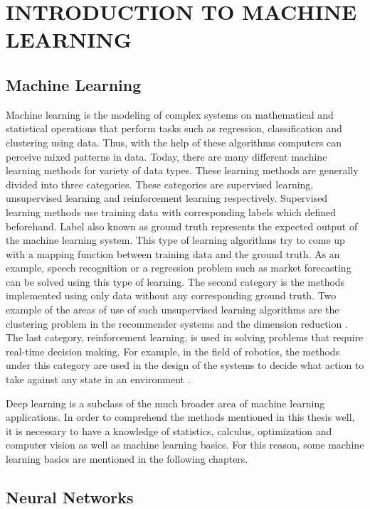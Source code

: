 \chapter{INTRODUCTION TO MACHINE LEARNING }\label{intro_to_ml}

\section{Machine Learning}

Machine learning is the modeling of complex systems on mathematical and statistical operations that perform tasks such as regression, classification and clustering using data. Thus, with the help of these algorithms computers can perceive mixed patterns in data. Today, there are many different machine learning methods for variety of data types. These learning methods are generally divided into three categories. These categories are supervised learning, unsupervised learning and reinforcement learning respectively. Supervised learning methods use training data with corresponding labels which defined beforehand. Label also known as ground truth represents the expected output of the machine learning system. This type of learning algorithms try to come up with a mapping function between training data and the ground truth. As an example, speech recognition \cite{speech_recognition} or a regression problem such as market forecasting \cite{market} can be solved using this type of learning. The second category is the methods implemented using only data without any corresponding ground truth. Two example of the areas of use of such unsupervised learning algorithms are the clustering problem in the recommender systems \cite{recommender_systems} and the dimension reduction \cite{pca}. The last category, reinforcement learning, is used in solving problems that require real-time decision making. For example, in the field of robotics, the methods under this category are used in the design of the systems to decide what action to take against any state in an environment \cite{robotics}.

Deep learning is a subclass of the much broader area of machine learning applications. In order to comprehend the methods mentioned in this thesis well, it is necessary to have a knowledge of statistics, calculus, optimization and computer vision as well as machine learning basics. For this reason, some machine learning basics are mentioned in the following chapters.

\section{Neural Networks}


